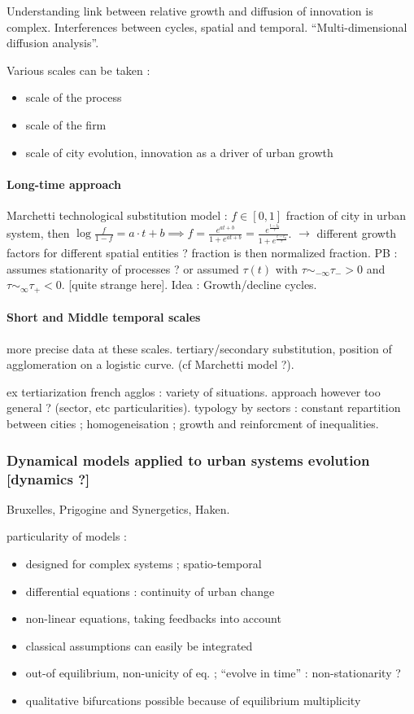 Understanding link between relative growth and diffusion of innovation is complex. Interferences between cycles, spatial and temporal. ``Multi-dimensional diffusion analysis''.

Various scales can be taken :
\begin{itemize}
\item scale of the process
\item scale of the firm
\item scale of city evolution, innovation as a driver of urban growth
\end{itemize}

\paragraph{Long-time approach}

Marchetti technological substitution model : $f\in [0,1]$ fraction of city in urban system, then $\log{\frac{f}{1-f}} = a\cdot t + b \implies f = \frac{e^{at+b}}{1+e^{at+b}} = \frac{e^{\frac{t-t_0}{\tau}}}{1+e^{\frac{t-t_0}{\tau}}}$. $\rightarrow$ different growth factors for different spatial entities ? fraction is then normalized fraction. PB : assumes stationarity of processes ? or assumed $\tau (t)$ with $\tau \sim_{- \infty} \tau_{-} > 0 $ and $\tau \sim_{\infty} \tau_{+} < 0 $. [quite strange here]. Idea : Growth/decline cycles.


\paragraph{Short and Middle temporal scales}

more precise data at these scales. tertiary/secondary substitution, position of agglomeration on a logistic curve. (cf Marchetti model ?). 

ex tertiarization french agglos : variety of situations. approach however too general ? (sector, etc particularities). typology by sectors : constant repartition between cities ; homogeneisation ; growth and reinforcment of inequalities.


\subsubsection{Dynamical models applied to urban systems evolution [dynamics ?]}

Bruxelles, Prigogine and Synergetics, Haken.

particularity of models :
\begin{itemize}
\item designed for complex systems ; spatio-temporal
\item differential equations : continuity of urban change
\item non-linear equations, taking feedbacks into account
\item classical assumptions can easily be integrated
\item out-of equilibrium, non-unicity of eq. ; ``evolve in time'' : non-stationarity ?
\item qualitative bifurcations possible because of equilibrium multiplicity
\end{itemize}


